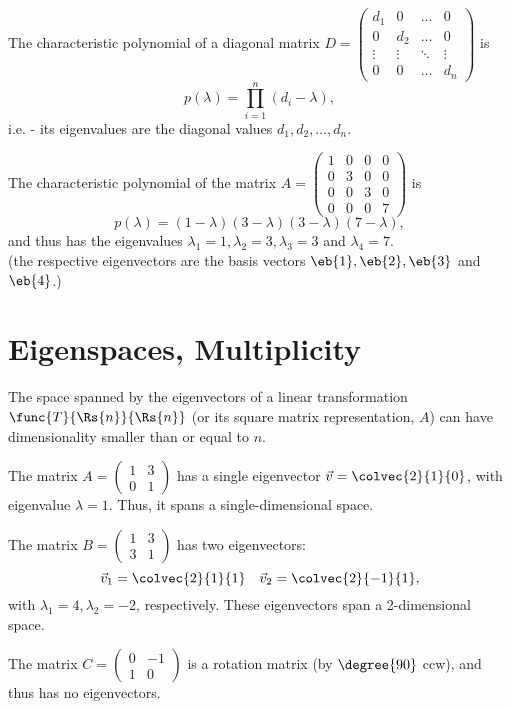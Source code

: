 The characteristic polynomial of a diagonal matrix $D=\begin{pmatrix} d_{1} & 0 & \dots & 0 \\ 0 & d_{2} & \dots & 0\\ \vdots & \vdots & \ddots & \vdots \\ 0 & 0 & \dots & d_{n} \end{pmatrix}$ is
\begin{equation*}
  p(\lambda) = \prod\limits_{i=1}^{n}\left(d_{i}-\lambda\right),
\end{equation*}
i.e. - its eigenvalues are the diagonal values $d_{1},d_{2},\dots,d_{n}$.
\begin{example}
  The characteristic polynomial of the matrix $A=\begin{pmatrix} 1 & 0 & 0 & 0\\ 0 & 3 & 0 & 0 \\ 0 & 0 & 3 & 0\\ 0 & 0 & 0 & 7 \end{pmatrix}$ is
  \begin{equation*}
	p(\lambda) = \left( 1-\lambda \right)\left( 3-\lambda \right)\left( 3-\lambda \right)\left( 7-\lambda \right),
  \end{equation*}
  and thus has the eigenvalues $\lambda_{1}=1, \lambda_{2}=3, \lambda_{3}=3$ and $\lambda_{4}=7$.\\
  (the respective eigenvectors are the basis vectors $\eb{1}, \eb{2}, \eb{3}$ and $\eb{4}$.)
\end{example}

\section{Eigenspaces, Multiplicity}
The space spanned by the eigenvectors of a linear transformation $\func{T}{\Rs{n}}{\Rs{n}}$ (or its square matrix representation, $A$) can have dimensionality smaller than or equal to $n$.

\begin{example}
  The matrix $A=\begin{pmatrix} 1 & 3 \\ 0 & 1 \end{pmatrix}$ has a single eigenvector $\vec{v}=\colvec{2}{1}{0}$, with eigenvalue $\lambda=1$.
  Thus, it spans a single-dimensional space.

  The matrix $B=\begin{pmatrix} 1 & 3 \\ 3 & 1 \end{pmatrix}$ has two eigenvectors:
  \begin{equation*}
	\vec{v}_{1} = \colvec{2}{1}{1} \quad \vec{v}_{2}=\colvec{2}{-1}{1},
  \end{equation*}
  with $\lambda_{1}=4, \lambda_{2}=-2$, respectively. These eigenvectors span a 2-dimensional space.

  The matrix $C=\begin{pmatrix} 0 & -1 \\ 1 & 0 \end{pmatrix}$ is a rotation matrix (by $\degree{90}$ ccw), and thus has no eigenvectors.
\end{example}

